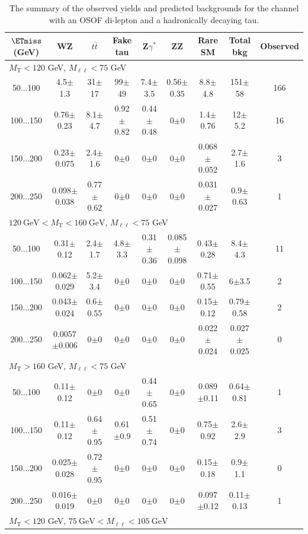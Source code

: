 \begin{landscape}
\begin{table}
\begin{center}
\caption{\label{tab:OSOF1tau1} The summary of the observed yields and predicted backgrounds for the channel with an OSOF di-lepton and a hadronically decaying tau. }
\begin{tabular}{| c | c c c c c c  | c  c | }\hline\hline
$\ETmiss$ (GeV) & WZ & $t\bar{t}$ & Fake tau & Z$\gamma^*$ & ZZ & Rare SM & Total bkg & Observed\\\hline\hline
\multicolumn{7}{l}{$M_{\text{T}} < 120$ GeV, $M_{\ell\ell} < 75$ GeV}\\\hline\hline
50$\dots$100&4.5$\pm$1.3&31$\pm$17&99$\pm$49&7.4$\pm$3.5&0.56$\pm$0.35&8.8$\pm$4.8&151$\pm$58&166\\
100$\dots$150&0.76$\pm$0.23&8.1$\pm$4.7&0.92$\pm$0.82&0.44$\pm$0.48&0$\pm$0&1.4$\pm$0.76&12$\pm$5.2&16\\
150$\dots$200&0.23$\pm$0.075&2.4$\pm$1.6&0$\pm$0&0$\pm$0&0$\pm$0&0.068$\pm$0.052&2.7$\pm$1.6&3\\
200$\dots$250&0.098$\pm$0.038&0.77$\pm$0.62&0$\pm$0&0$\pm$0&0$\pm$0&0.031$\pm$0.027&0.9$\pm$0.63&1\\
\hline\hline
\multicolumn{7}{l}{$120~\mathrm{GeV} < M_{\text{T}} < 160~\mathrm{GeV}$, $M_{\ell\ell} < 75$ GeV}\\\hline\hline
50$\dots$100&0.31$\pm$0.12&2.4$\pm$1.7&4.8$\pm$3.3&0.31$\pm$0.36&0.085$\pm$0.098&0.43$\pm$0.28&8.4$\pm$4.3&11\\
100$\dots$150&0.062$\pm$0.029&5.2$\pm$3.4&0$\pm$0&0$\pm$0&0$\pm$0&0.71$\pm$0.55&6$\pm$3.5&2\\
150$\dots$200&0.043$\pm$0.024&0.6$\pm$0.55&0$\pm$0&0$\pm$0&0$\pm$0&0.15$\pm$0.12&0.79$\pm$0.58&2\\
200$\dots$250&0.0057$\pm$0.006&0$\pm$0&0$\pm$0&0$\pm$0&0$\pm$0&0.022$\pm$0.024&0.027$\pm$0.025&0\\
\hline\hline
\multicolumn{7}{l}{$M_{\text{T}} > 160$ GeV, $M_{\ell\ell} < 75$ GeV}\\\hline\hline
50$\dots$100&0.11$\pm$0.12&0$\pm$0&0$\pm$0&0.44$\pm$0.65&0$\pm$0&0.089$\pm$0.11&0.64$\pm$0.81&1\\
100$\dots$150&0.11$\pm$0.12&0.64$\pm$0.95&0.61$\pm$0.9&0.51$\pm$0.74&0$\pm$0&0.75$\pm$0.92&2.6$\pm$2.9&3\\
150$\dots$200&0.025$\pm$0.028&0.72$\pm$0.95&0$\pm$0&0$\pm$0&0$\pm$0&0.15$\pm$0.18&0.9$\pm$1.1&0\\
200$\dots$250&0.016$\pm$0.019&0$\pm$0&0$\pm$0&0$\pm$0&0$\pm$0&0.097$\pm$0.12&0.11$\pm$0.13&1\\
\hline\hline
\multicolumn{7}{l}{$M_{\text{T}} < 120$ GeV, $75~\mathrm{GeV} < M_{\ell\ell} < 105~\mathrm{GeV}$}\\\hline\hline

\end{tabular}
\end{center}
\end{table}
\end{landscape}
